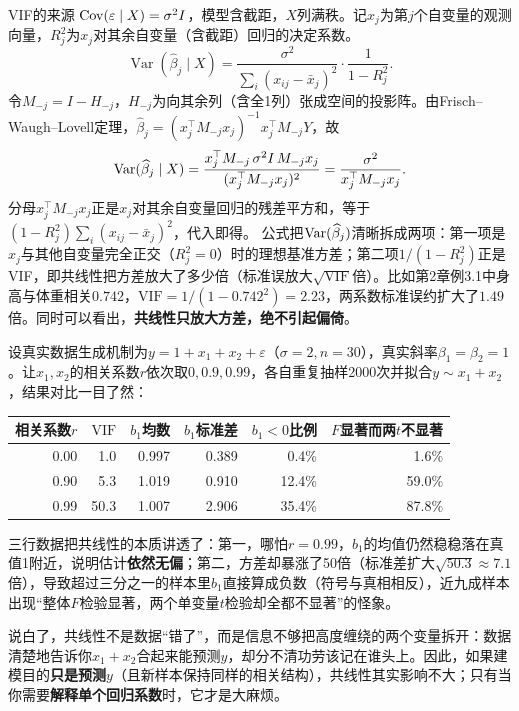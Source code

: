 \begin{derivation}{VIF的来源}
$\operatorname{Cov}(\varepsilon\mid X)=\sigma^2I$，模型含截距，$X$列满秩。记$x_j$为第$j$个自变量的观测向量，$R_j^2$为$x_j$对其余自变量（含截距）回归的决定系数。
\[
\operatorname{Var}(\widehat\beta_j\mid X)
=\frac{\sigma^2}{\sum_i(x_{ij}-\bar x_j)^2}\cdot\frac1{1-R_j^2}.
\]
令$M_{-j}=I-H_{-j}$，$H_{-j}$为向其余列（含全1列）张成空间的投影阵。由Frisch--Waugh--Lovell定理，$\widehat\beta_j=(x_j^\top M_{-j}x_j)^{-1}x_j^\top M_{-j}Y$，故
\[
\operatorname{Var}(\widehat\beta_j\mid X)=\frac{x_j^\top M_{-j}\,\sigma^2I\,M_{-j}x_j}{(x_j^\top M_{-j}x_j)^2}=\frac{\sigma^2}{x_j^\top M_{-j}x_j}.
\]
分母$x_j^\top M_{-j}x_j$正是$x_j$对其余自变量回归的残差平方和，等于$(1-R_j^2)\sum_i(x_{ij}-\bar x_j)^2$，代入即得。
公式把$\operatorname{Var}(\widehat\beta_j)$清晰拆成两项：第一项是$x_j$与其他自变量完全正交（$R_j^2=0$）时的理想基准方差；第二项$1/(1-R_j^2)$正是VIF，即共线性把方差放大了多少倍（标准误放大$\sqrt{\mathrm{VIF}}$倍）。比如第2章例3.1中身高与体重相关$0.742$，$\mathrm{VIF}=1/(1-0.742^2)=2.23$，两系数标准误约扩大了$1.49$倍。同时可以看出，\textbf{共线性只放大方差，绝不引起偏倚}。
\end{derivation}

\begin{sikao}
设真实数据生成机制为$y=1+x_1+x_2+\varepsilon$（$\sigma=2,n=30$），真实斜率$\beta_1=\beta_2=1$。让$x_1,x_2$的相关系数$r$依次取$0,0.9,0.99$，各自重复抽样2000次并拟合$y\sim x_1+x_2$，结果对比一目了然：
\begin{center}\small\setlength{\tabcolsep}{4.5pt}
\begin{tabular}{rrrrrr}
\toprule 相关系数$r$&$\mathrm{VIF}$&$b_1$均数&$b_1$标准差&$b_1<0$比例&$F$显著而两$t$不显著\\\midrule
0.00&1.0&0.997&0.389&0.4\%&1.6\%\\
0.90&5.3&1.019&0.910&12.4\%&59.0\%\\
0.99&50.3&1.007&2.906&35.4\%&87.8\%\\\bottomrule
\end{tabular}
\end{center}
三行数据把共线性的本质讲透了：第一，哪怕$r=0.99$，$b_1$的均值仍然稳稳落在真值1附近，说明估计\textbf{依然无偏}；第二，方差却暴涨了50倍（标准差扩大$\sqrt{50.3}\approx 7.1$倍），导致超过三分之一的样本里$b_1$直接算成负数（符号与真相相反），近九成样本出现“整体$F$检验显著，两个单变量$t$检验却全都不显著”的怪象。

说白了，共线性不是数据“错了”，而是信息不够把高度缠绕的两个变量拆开：数据清楚地告诉你$x_1+x_2$合起来能预测$y$，却分不清功劳该记在谁头上。因此，如果建模目的\textbf{只是预测$y$}（且新样本保持同样的相关结构），共线性其实影响不大；只有当你需要\textbf{解释单个回归系数}时，它才是大麻烦。
\end{sikao}

